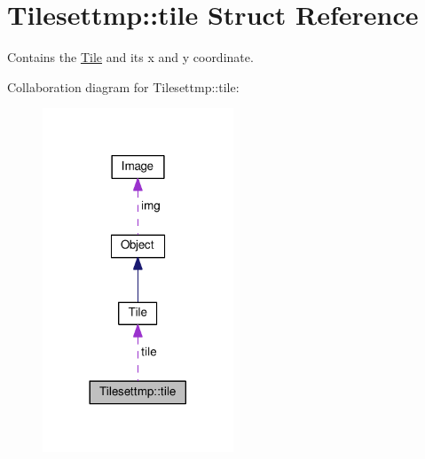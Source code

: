 \hypertarget{structTilesettmp_1_1tile}{}\section{Tilesettmp\+:\+:tile Struct Reference}
\label{structTilesettmp_1_1tile}


Contains the \hyperlink{classTile}{Tile} and its x and y coordinate.  




Collaboration diagram for Tilesettmp\+:\+:tile\+:
\nopagebreak
\begin{figure}[H]
\begin{center}
\leavevmode
\includegraphics[width=161pt]{structTilesettmp_1_1tile__coll__graph}
\end{center}
\end{figure}
